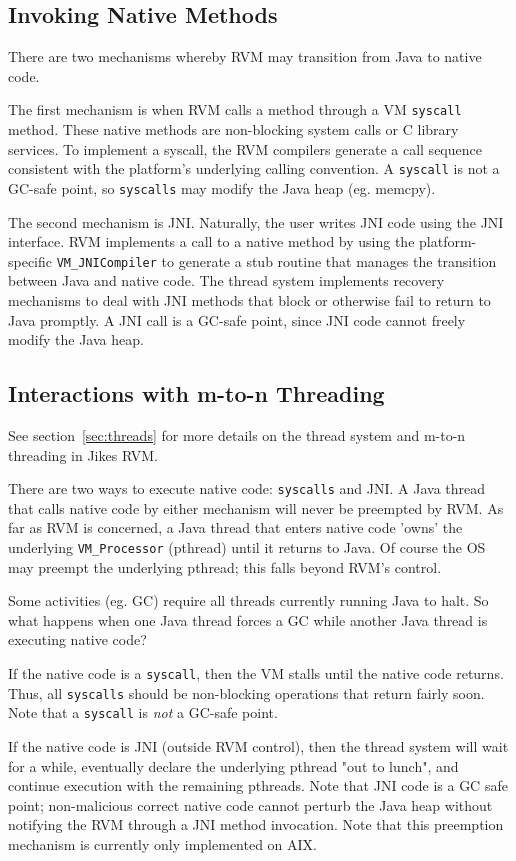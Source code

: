 \subsection{Invoking Native Methods}
There are two mechanisms whereby RVM may transition from Java to native
code.

The first mechanism is when RVM calls a method through a VM {\tt syscall}
method.  These native methods are non-blocking system calls or C library 
services.  To implement a syscall, the RVM compilers generate a call
sequence consistent with the platform's underlying calling convention.
A {\tt syscall} is not a GC-safe point, so {\tt syscalls} may modify the
Java heap (eg. memcpy).

The second mechanism is JNI.  Naturally, the user writes JNI code
using the JNI interface.  RVM implements a call to a native method by
using the platform-specific {\tt VM\_JNICompiler} to generate a stub
routine that manages the transition between Java and native code.  The
thread system implements recovery mechanisms to deal with JNI methods
that block or otherwise fail to return to Java promptly.  A JNI call
is a GC-safe point, since JNI code cannot freely modify the Java heap.

\subsection{Interactions with m-to-n Threading}
See section~\ref{sec:threads} for more details on the thread system
and m-to-n threading in Jikes RVM. 

There are two ways to execute native code: {\tt syscalls} and JNI.
A Java thread that calls native code by either mechanism will never
be preempted by RVM.  As far as RVM is concerned, a Java thread that
enters native code 'owns' the underlying {\tt VM\_Processor} (pthread)
until it returns to Java.  Of course the OS may preempt the underlying
pthread; this falls beyond RVM's control.

Some activities (eg. GC) require all threads currently running Java to halt.  
So what happens when one Java thread forces a GC while another Java thread is
executing native code?

If the native code is a {\tt syscall}, then the VM stalls until the native
code returns.  Thus, all {\tt syscalls} should be non-blocking
operations that return fairly soon.  Note that a {\tt syscall} is 
{\em not} a GC-safe point.

If the native code is JNI (outside RVM control), then the thread system
will wait for a while, eventually declare the underlying pthread "out to
lunch", and continue execution with the remaining pthreads.  Note that 
JNI code is a GC safe point; non-malicious correct native code cannot
perturb the Java heap without notifying the RVM through a JNI method
invocation.  Note that this preemption mechanism is currently only
implemented on AIX.

